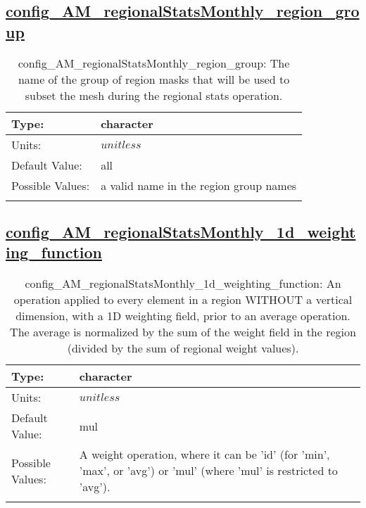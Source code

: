 \subsection[config\_AM\_regionalStatsMonthly\_region\_group]{\hyperref[sec:nm_tab_AM_regionalStatsMonthly]{config\_AM\_regionalStatsMonthly\_region\_group}}
\label{subsec:nm_sec_config_AM_regionalStatsMonthly_region_group}
\begin{center}
\begin{longtable}{| p{2.0in} || p{4.0in} |}
    \hline
    Type: & character \\
    \hline
    Units: & $unitless$ \\
    \hline
    Default Value: & all \\
    \hline
    Possible Values: & a valid name in the region group names \\
    \hline
    \caption{config\_AM\_regionalStatsMonthly\_region\_group: The name of the group of region masks that will be used to subset the mesh during the regional stats operation.}
\end{longtable}
\end{center}
\subsection[config\_AM\_regionalStatsMonthly\_1d\_weighting\_function]{\hyperref[sec:nm_tab_AM_regionalStatsMonthly]{config\_AM\_regionalStatsMonthly\_1d\_weighting\_function}}
\label{subsec:nm_sec_config_AM_regionalStatsMonthly_1d_weighting_function}
\begin{center}
\begin{longtable}{| p{2.0in} || p{4.0in} |}
    \hline
    Type: & character \\
    \hline
    Units: & $unitless$ \\
    \hline
    Default Value: & mul \\
    \hline
    Possible Values: & A weight operation, where it can be 'id' (for 'min', 'max', or 'avg') or 'mul' (where 'mul' is restricted to 'avg'). \\
    \hline
    \caption{config\_AM\_regionalStatsMonthly\_1d\_weighting\_function: An operation applied to every element in a region WITHOUT a vertical dimension, with a 1D weighting field, prior to an average operation. The average is normalized by the sum of the weight field in the region (divided by the sum of regional weight values).}
\end{longtable}
\end{center}
